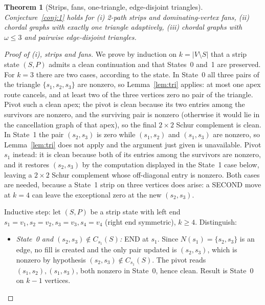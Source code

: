 \documentclass[11pt]{article}
\theoremstyle{plain}
\newtheorem{theorem}{Theorem}[section]
\theoremstyle{definition}
\begin{document}
\begin{aiblock}
\begin{theorem}[Strips, fans, one-triangle, edge-disjoint triangles]\label{thm:positives}
Conjecture~\ref{conj:1} holds for (i) 2-path strips and dominating-vertex fans, (ii) chordal graphs with exactly one triangle adaptively, (iii) chordal graphs with $\omega\le3$ and pairwise edge-disjoint triangles.
\end{theorem}
\begin{proof}[Proof of (i), strips and fans]
We prove by induction on $k=|V\setminus S|$ that a strip state $(S,P)$ admits a clean continuation and that States~0 and~1 are preserved. For $k=3$ there are two cases, according to the state. In State~0 all three pairs of the triangle
$\{s_1,s_2,s_3\}$ are nonzero, so Lemma~\ref{lem:tri} applies: at most one apex route cancels, and at
least two of the three vertices zero no pair of the triangle. Pivot such a clean apex; the pivot is
clean because its two entries among the survivors are nonzero, and the surviving pair is nonzero
(otherwise it would lie in the cancellation graph of that apex), so the final $2\times2$ Schur
complement is clean. In State~1 the pair $(s_2,s_3)$ is zero while $(s_1,s_2)$ and $(s_1,s_3)$ are
nonzero, so Lemma~\ref{lem:tri} does not apply and the argument just given is unavailable. Pivot
$s_1$ instead: it is clean because both of its entries among the survivors are nonzero, and it
restores $(s_2,s_3)$ by the computation displayed in the State~1 case below, leaving a $2\times2$
Schur complement whose off-diagonal entry is nonzero. Both cases are needed, because a State~1 strip
on three vertices does arise: a SECOND move at $k=4$ can leave the exceptional zero at the new
$(s_2,s_3)$.

Inductive step: let $(S,P)$ be a strip state with left end $s_1=v_1,s_2=v_2,s_3=v_3,s_4=v_4$ (right end symmetric), $k\ge4$. Distinguish:

\begin{itemize}
\item \emph{State~0 and $(s_2,s_3)\notin C_{s_1}(S)$:} END at $s_1$. Since $N(s_1)=\{s_2,s_3\}$ is an edge, no fill is created and the only pair updated is $(s_2,s_3)$, which is nonzero by hypothesis $(s_2,s_3)\notin C_{s_1}(S)$. The pivot reads $(s_1,s_2),(s_1,s_3)$, both nonzero in State~0, hence clean. Result is State~0 on $k-1$ vertices.


\end{itemize}
\end{proof}
\end{aiblock}
\end{document}
